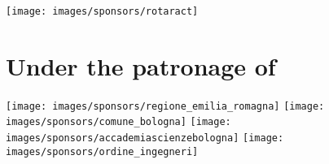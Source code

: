 \begin{center}
\begin{multicols}{4}
\texttt{[image: images/sponsors/rotaract]} 
\end{multicols}

\section*{Under the patronage of}
\vspace{0.1cm}

\begin{multicols}{4}
\texttt{[image: images/sponsors/regione\_emilia\_romagna]}
\texttt{[image: images/sponsors/comune\_bologna]}
\texttt{[image: images/sponsors/accademiascienzebologna]}
\texttt{[image: images/sponsors/ordine\_ingegneri]}
\end{multicols}

\end{center}
\setlength{\columnseprule}{0.5pt}


